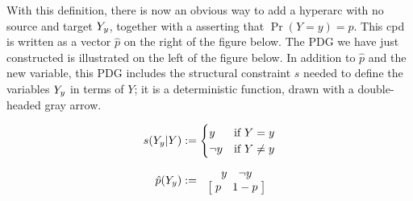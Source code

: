 With this definition, there is now an obvious way to add a hyperarc with no source and
    target ${Y_y}$, together with a asserting that $\Pr(Y{=}y)=p$.
This cpd is written as a vector $\hat p$ on the right of the figure below.
The PDG we have just constructed is illustrated on the left of the figure below.
In addition to $\hat p$ and the new variable, this PDG
    includes the structural constraint $s$ needed to define the variables
    ${Y_y}$ in terms of $Y$; it is a deterministic function,
    drawn with a double-headed gray arrow.

\begin{center}
    \hspace{1cm}
    \begin{minipage}{0.3\textwidth}
        \begin{align*}
            s({Y_y}|Y) &:= \begin{cases}
                y & \text{if $Y=y$} \\
                \lnot y & \text{if $Y\ne y$} \\
            \end{cases}\\[1ex]
            \hat p({Y_y}) &:= ~~\begin{matrix}
                  \begin{matrix} y & \lnot y \end{matrix} \\
                    \begin{bmatrix}
                        \;p & 1-p \;
                    \end{bmatrix}
            \end{matrix}
        \end{align*}
    \end{minipage}
\end{center}
    \medskip


